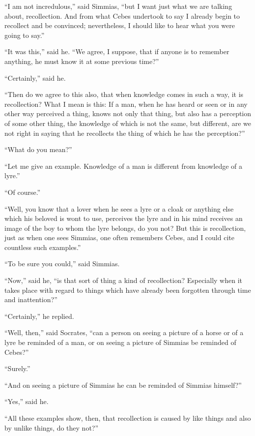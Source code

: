 \documentclass[letterpaper,12pt]{article}
\newcommand{\stephpag}[1]{\marginnote{\small\itshape\fontfamily{ppl}\selectfont #1}}
\begin{document}
\begin{drama}
``I am not incredulous,'' said Simmias, ``but I want just what we are talking about, recollection. And from what Cebes undertook to say I already begin to recollect and be convinced; nevertheless, I should like to hear \stephpag{c} what you were going to say.''
 
``It was this,'' said he. ``We agree, I suppose, that if anyone is to remember anything, he must know it at some previous time?''
 
``Certainly,'' said he.
 
``Then do we agree to this also, that when knowledge comes in such a way, it is recollection? What I mean is this: If a man, when he has heard or seen or in any other way perceived a thing, knows not only that thing, but also has a perception of some other thing, the knowledge of which is not the same, but different, are we not right in saying that \stephpag{d} he recollects the thing of which he has the perception?''
 
``What do you mean?''
 
``Let me give an example. Knowledge of a man is different from knowledge of a lyre.''
 
``Of course.''
 
``Well, you know that a lover when he sees a lyre or a cloak or anything else which his beloved is wont to use, perceives the lyre and in his mind receives an image of the boy to whom the lyre belongs, do you not? But this is recollection, just as when one sees Simmias, one often remembers Cebes, and I could cite countless such examples.''
 
``To be sure you could,'' said Simmias.
 
``Now,'' said he, \stephpag{e} ``is that sort of thing a kind of recollection? Especially when it takes place with regard to things which have already been forgotten through time and inattention?''
 
``Certainly,'' he replied.
 
``Well, then,'' said Socrates, ``can a person on seeing a picture of a horse or of a lyre be reminded of a man, or on seeing a picture of Simmias be reminded of Cebes?''
 
``Surely.''
 
``And on seeing a picture of Simmias he can be reminded \stephpag{74 a} of Simmias himself?''
 
``Yes,'' said he.
 
``All these examples show, then, that recollection is caused by like things and also by unlike things, do they not?''
 

\end{drama}
\end{document}
